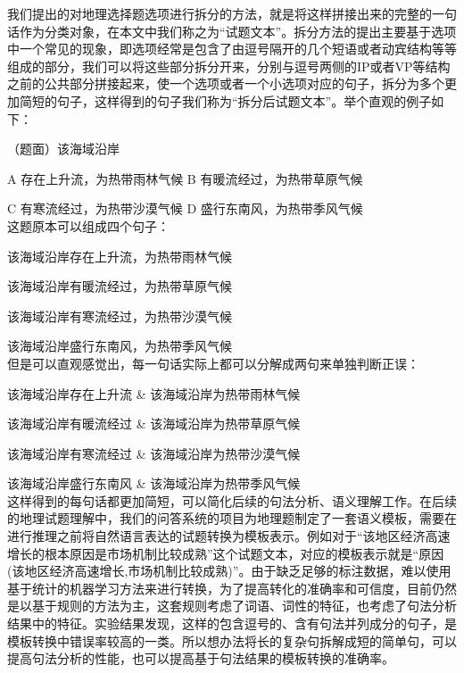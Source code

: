 \documentclass[master, winfont]{njuthesis}
\begin{document}
我们提出的对地理选择题选项进行拆分的方法，就是将这样拼接出来的完整的一句话作为分类对象，在本文中我们称之为“试题文本”。拆分方法的提出主要基于选项中一个常见的现象，即选项经常是包含了由逗号隔开的几个短语或者动宾结构等等组成的部分，我们可以将这些部分拆分开来，分别与逗号两侧的IP或者VP等结构之前的公共部分拼接起来，使一个选项或者一个小选项对应的句子，拆分为多个更加简短的句子，这样得到的句子我们称为“拆分后试题文本”。举个直观的例子如下：

（题面）该海域沿岸 \par
A 存在上升流，为热带雨林气候   B 有暖流经过，为热带草原气候\par
C 有寒流经过，为热带沙漠气候   D 盛行东南风，为热带季风气候\\

这题原本可以组成四个句子：\par
该海域沿岸存在上升流，为热带雨林气候\par
该海域沿岸有暖流经过，为热带草原气候\par
该海域沿岸有寒流经过，为热带沙漠气候\par
该海域沿岸盛行东南风，为热带季风气候\\

但是可以直观感觉出，每一句话实际上都可以分解成两句来单独判断正误：\par
该海域沿岸存在上升流 \& 该海域沿岸为热带雨林气候\par
该海域沿岸有暖流经过 \& 该海域沿岸为热带草原气候\par
该海域沿岸有寒流经过 \& 该海域沿岸为热带沙漠气候\par
该海域沿岸盛行东南风 \& 该海域沿岸为热带季风气候\\

这样得到的每句话都更加简短，可以简化后续的句法分析、语义理解工作。在后续的地理试题理解中，我们的问答系统的项目为地理题制定了一套语义模板，需要在进行推理之前将自然语言表达的试题转换为模板表示。例如对于“该地区经济高速增长的根本原因是市场机制比较成熟”这个试题文本，对应的模板表示就是“原因(该地区经济高速增长,市场机制比较成熟)”。由于缺乏足够的标注数据，难以使用基于统计的机器学习方法来进行转换，为了提高转化的准确率和可信度，目前仍然是以基于规则的方法为主，这套规则考虑了词语、词性的特征，也考虑了句法分析结果中的特征。实验结果发现，这样的包含逗号的、含有句法并列成分的句子，是模板转换中错误率较高的一类。所以想办法将长的复杂句拆解成短的简单句，可以提高句法分析的性能，也可以提高基于句法结果的模板转换的准确率。
\end{document}
